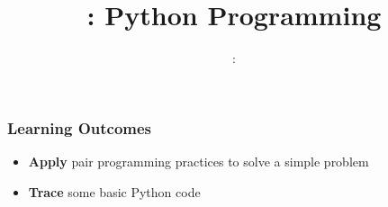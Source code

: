 \usepackage{../../../beamerthemeFalmouthGamesAcademy}
\usepackage{multimedia}
\graphicspath{ {../../../} }

\usepackage{textcomp}


\usepackage[normalem]{ulem}
\usepackage{wasysym}

\usepackage{pdfpages}

\usetikzlibrary{arrows,automata}







\title{\sessionnumber: Python Programming}
\subtitle{\modulecode: \moduletitle}

\frame{\titlepage} 

\begin{frame}
	\frametitle{Learning Outcomes}
	\begin{itemize}
		\item \textbf{Apply} pair programming practices to solve a simple problem
		\item\textbf{Trace} some basic Python code
	\end{itemize}
\end{frame}







